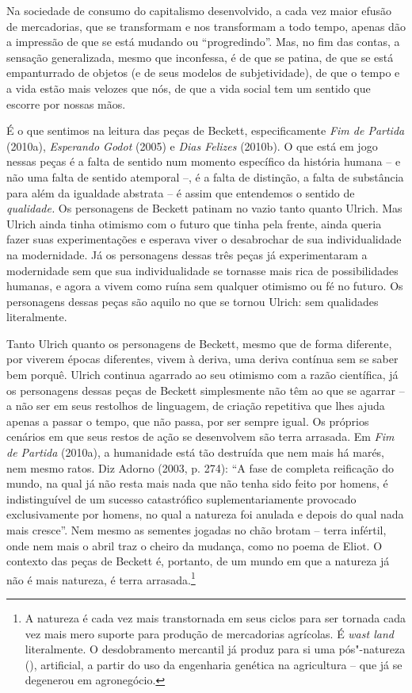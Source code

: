 Na sociedade de consumo do capitalismo desenvolvido, a cada vez maior
efusão de mercadorias, que se transformam e nos transformam a todo
tempo, apenas dão a impressão de que se está mudando ou ``progredindo''.
Mas, no fim das contas, a sensação generalizada, mesmo que inconfessa, é
de que se patina, de que se está empanturrado de objetos (e de seus
modelos de subjetividade), de que o tempo e a vida estão mais velozes
que nós, de que a vida social tem um sentido que escorre por nossas
mãos.

É o que sentimos na leitura das peças de Beckett, especificamente
\emph{Fim de Partida} (2010a), \emph{Esperando Godot} (2005) e
\emph{Dias Felizes} (2010b). O que está em jogo nessas peças é a falta
de sentido num momento específico da história humana -- e não uma falta
de sentido atemporal --, é a falta de distinção, a falta de substância
para além da igualdade abstrata -- é assim que entendemos o sentido de
\emph{qualidade.} Os personagens de Beckett patinam no vazio tanto
quanto Ulrich. Mas Ulrich ainda tinha otimismo com o futuro que tinha
pela frente, ainda queria fazer suas experimentações e esperava viver o
desabrochar de sua individualidade na modernidade. Já os personagens
dessas três peças já experimentaram a modernidade sem que sua
individualidade se tornasse mais rica de possibilidades humanas, e agora
a vivem como ruína sem qualquer otimismo ou fé no futuro. Os personagens
dessas peças são aquilo no que se tornou Ulrich: sem qualidades
literalmente.

Tanto Ulrich quanto os personagens de Beckett, mesmo que de forma
diferente, por viverem épocas diferentes, vivem à deriva, uma deriva
contínua sem se saber bem porquê. Ulrich continua agarrado ao seu
otimismo com a razão científica, já os personagens dessas peças de
Beckett simplesmente não têm ao que se agarrar -- a não ser em seus
restolhos de linguagem, de criação repetitiva que lhes ajuda apenas a
passar o tempo, que não passa, por ser sempre igual. Os próprios
cenários em que seus restos de ação se desenvolvem são terra arrasada.
Em \emph{Fim de Partida} (2010a), a humanidade está tão destruída
que nem mais há marés, nem mesmo ratos. Diz Adorno (2003, p. 274): ``A
fase de completa reificação do mundo, na qual já não resta mais nada que
não tenha sido feito por homens, é indistinguível de um sucesso
catastrófico suplementariamente provocado exclusivamente por homens, no
qual a natureza foi anulada e depois do qual nada mais cresce''. Nem
mesmo as sementes jogadas no chão brotam -- terra infértil, onde nem
mais o abril traz o cheiro da mudança, como no poema de Eliot. O
contexto das peças de Beckett é, portanto, de um mundo em que a natureza
já não é mais natureza, é terra arrasada.\footnote{A natureza é cada vez
  mais transtornada em seus ciclos para ser tornada cada vez mais mero
  suporte para produção de mercadorias agrícolas. É \emph{wast land}
  literalmente. O desdobramento mercantil já produz para si uma
  pós"-natureza (), artificial, a partir do uso da engenharia
  genética na agricultura -- que já se degenerou em agronegócio.}

